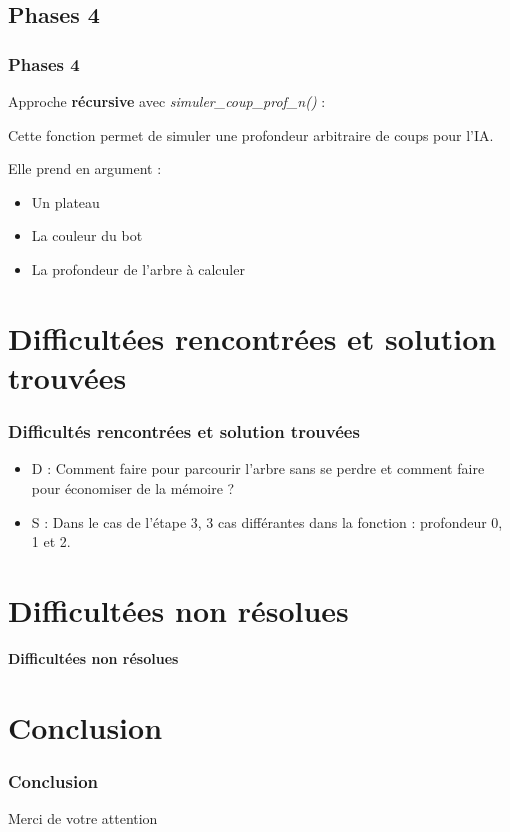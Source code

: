 \documentclass[9pt]{beamer}
\begin{document}
\subsection{Phases 4}
\begin{frame}
  \frametitle{Phases 4}
  Approche \textbf{récursive} avec \textit{simuler\_coup\_prof\_n()} :

  Cette fonction permet de simuler une profondeur arbitraire de coups pour l’IA.

  Elle prend en argument :
  \begin{itemize}
    \item Un plateau
    \item La couleur du bot
    \item La profondeur de l’arbre à calculer
  \end{itemize}
\end{frame}

\section{Difficultées rencontrées et solution trouvées}
\begin{frame}
  \frametitle{Difficultés rencontrées et solution trouvées}
  \begin{itemize}
  \item D : Comment faire pour parcourir l'arbre sans se perdre et comment faire pour économiser de la mémoire ?
  \item S : Dans le cas de l'étape 3, 3 cas différantes dans la fonction : profondeur 0, 1 et 2.   
  \end{itemize}
\end{frame}

\section{Difficultées non résolues}
\begin{frame}
  \begin{center}
      \Large \textbf{Difficultées non résolues}
  \end{center}
\end{frame}

\section{Conclusion}
\begin{frame}
  \frametitle{Conclusion}
  Merci de votre attention
\end{frame}
\end{document}

